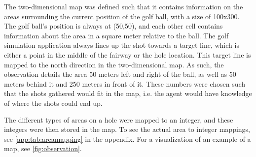 \documentclass{kththesis}
\begin{document}
The two-dimensional map was defined such that it contains information on the areas surrounding the current position of the golf ball, with a size of 100x300. The golf ball's position is always at (50,50), and each other cell contains information about the area in a square meter relative to the ball. The golf simulation application always lines up the shot towards a target line, which is either a point in the middle of the fairway or the hole location. This target line is mapped to the north direction in the two-dimensional map. As such, the observation details the area 50 meters left and right of the ball, as well as 50 meters behind it and 250 meters in front of it. These numbers were chosen such that the shots gathered would fit in the map, i.e. the agent would have knowledge of where the shots could end up. 

The different types of areas on a hole were mapped to an integer, and these integers were then stored in the map. To see the actual area to integer mappings, see \autoref{app:tab:areamapping} in the appendix. For a visualization of an example of a map, see \autoref{fig:observation}.
\end{document}
